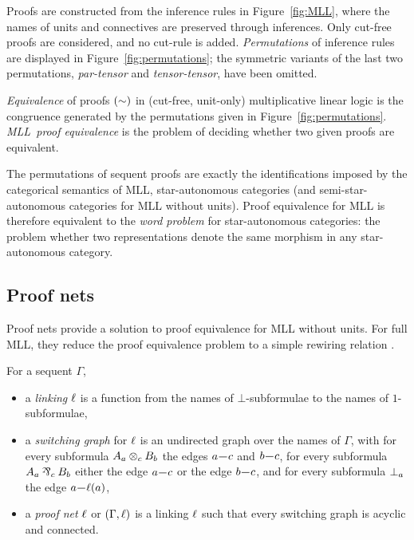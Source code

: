 \documentclass{sigplanconf-modified}
\let\aftersubsection=\noindent
\let\capsabbrev=\uppercase
\begin{document}
Proofs are constructed from the inference rules in Figure~\ref{fig:MLL}, where the names of units and connectives are preserved through inferences.
%
Only cut-free proofs are considered, and no cut-rule is added.
%
\emph{Permutations} of inference rules are displayed in Figure~\ref{fig:permutations}; the symmetric variants of the last two permutations, \emph{par-tensor} and \emph{tensor-tensor}, have been omitted.



\begin{definition}
\label{def:equivalence}
%
\emph{Equivalence} of proofs $(\perm)$ in (cut-free, unit-only) multiplicative linear logic is the congruence generated by the permutations given in Figure~\ref{fig:permutations}.
%
\emph{\capsabbrev{mll}\ proof equivalence} is the problem of deciding whether two given proofs are equivalent.
%
\end{definition}


The permutations of sequent proofs are exactly the identifications imposed by the categorical semantics of \capsabbrev{mll}, star-autonomous categories \cite{Barr-1991} (and semi-star-autonomous categories \cite{Houston-2008,Heijltjes-Strassburger} for \capsabbrev{mll} without units).
%
Proof equivalence for \capsabbrev{mll} is therefore equivalent to the \emph{word problem} for star-autonomous categories: the problem whether two representations denote the same morphism in any star-autonomous category.



\subsection*{Proof nets}

\aftersubsection
Proof nets provide a solution to proof equivalence for \capsabbrev{mll} without units.
%
For full \capsabbrev{mll}, they reduce the proof equivalence problem to a simple rewiring relation \cite{HughesMLLProofNets}.


\begin{definition}
\label{def:proof nets}
%
For a sequent $\Gamma$,
\begin{itemize}

	\item
	a \emph{linking} $\links$ is a function from the names of $\bot$-subformulae to the names of $1$-subformulae,

	\item
	a \emph{switching graph} for $\links$ is an undirected graph over the names of $\Gamma$, with for every subformula $\named aA\named c\tn\named bB$ the edges $\edge ac$ and $\edge bc$, for every subformula $\named aA\named c\parr\named bB$ either the edge $\edge ac$ or the edge $\edge bc$, and for every subformula $\named a\bot$ the edge $\edge a{\links(a)}$,

 	\item
	a \emph{proof net} $\links$ or $(\Gamma,\links)$ is a linking $\links$ such that every switching graph is acyclic and connected.

\end{itemize}
\end{definition}
\end{document}
